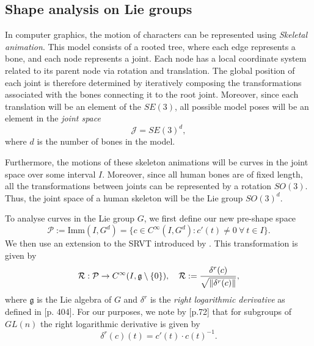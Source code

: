 \subsection{Shape analysis on Lie groups}\label{subsec:shape-lie}
In computer graphics, the motion of characters can be represented using \emph{Skeletal animation}. This model consists of a rooted tree, where each edge represents a bone, and each node represents a joint. Each node has a local coordinate system related to its parent node via rotation and translation. The global position of each joint is therefore determined by iteratively composing the transformations associated with the bones connecting it to the root joint. Moreover, since each translation will be an element of the \(SE(3)\), all possible model poses will be an element in the \emph{joint space}
\begin{equation}
  \mathcal{J} = SE(3)^d, 
\end{equation}
where \(d\) is the number of bones in the model.

Furthermore, the motions of these skeleton animations will be curves in the joint space over some interval \(I\). Moreover, since all human bones are of fixed length, all the transformations between joints can be represented by a rotation \(SO(3)\). Thus, the joint space of a human skeleton will be the Lie group \(SO(3)^d\). 

To analyse curves in the Lie group \(G\), we first define our new pre-shape space 
\begin{equation*}
  \mathcal{P}:= \text{Imm}(I, G^d) = \{c \in C^{\infty}(I, G^d) :  c'(t) \neq  0 \ \forall \ t \in I  \}. 
\end{equation*}
We then use an extension to the SRVT introduced by \citeauthor{celledoni2016} \cite{celledoni2016}. This transformation is given by 
\begin{equation*}
  \mathcal{R}: \mathcal{P} \rightarrow C^\infty(I, \mathfrak{g}\setminus \{0\} ), \quad \mathcal{R} := \frac{\delta^r(c)}{\sqrt{\norm{\delta^r(c)}}}, 
\end{equation*}
where \(\mathfrak{g}\) is the Lie algebra of \(G\) and \(\delta^r\) is the \emph{right logarithmic derivative} as defined in \cite{right_log_der}[p. 404]. For our purposes, we note by \cite{nice_form}[p.72] that for subgroups of $GL(n)$ the right logarithmic derivative is given by 
\begin{equation*}
   \delta^r(c)(t) = c'(t) \cdot c(t)^{-1}. 
\end{equation*}

